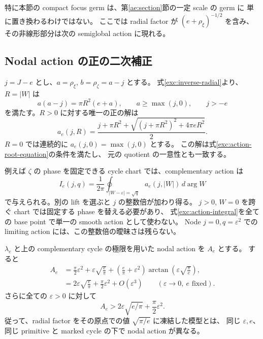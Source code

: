 特に本節の compact focus germ は、第\ref{ae:section}節の一定 scale の germ に
単に置き換わるわけではない。
ここでは radial factor が $(e+\rho_\xi)^{-1/2}$ を含み、
その非線形部分は次の semiglobal action に現れる。

\subsection{Nodal action の正の二次補正}

$j=J-e$ とし、$a=\rho_\xi$, $b=\rho_\zeta=a-j$ とする。
式\eqref{exc:inverse-radial}より、$R=|W|$ は
\begin{equation}\label{exc:action-root-equation}
 a(a-j)=\pi R^2(e+a),\qquad a\ge\max(j,0),\qquad j>-e
\end{equation}
を満たす。$R>0$ に対する唯一の正の解は
\begin{equation}\label{exc:action-root}
 a_e(j,R)=\frac{j+\pi R^2+
     \sqrt{(j+\pi R^2)^2+4\pi eR^2}}2.
\end{equation}
$R=0$ では連続的に $a_e(j,0)=\max(j,0)$ とする。
この解は式\eqref{exc:action-root-equation}の条件を満たし、
元の quotient の一意性とも一致する。

例えば $\zeta$ の phase を固定できる cycle chart では、complementary action は
\begin{equation}\label{exc:action-integral}
 I_e(j,q)=\frac1{2\pi}
       \oint_{|W-\varepsilon|=\sqrt q}a_e(j,|W|)\,d\arg W
\end{equation}
で与えられる。別の lift を選ぶと $j$ の整数倍が加わり得る。
$j>0$, $W=0$ を跨ぐ chart では固定する phase を替える必要があり、
式\eqref{exc:action-integral}を全ての base point で単一の smooth action として使わない。
Node $j=0,q=\varepsilon^2$ での limiting action には、この整数倍の曖昧さは残らない。

\begin{proposition}
\label{exc:nodal-action}
$\lambda_e$ と上の complementary cycle の極限を用いた nodal action を $A_e$ とする。
すると
\begin{align}
 A_e
 &=\frac{\pi}{2}\varepsilon^2
   +\varepsilon\sqrt{\frac e\pi}
   +\left(\frac e\pi+\varepsilon^2\right)
       \arctan\left(\varepsilon\sqrt{\frac\pi e}\right),
       \label{exc:action-closed}\\
 &=2\varepsilon\sqrt{\frac e\pi}
     +\frac\pi2\varepsilon^2+O(\varepsilon^3)
       \qquad(\varepsilon\to0,\ e\text{ fixed}).\label{exc:action-expansion}
\end{align}
さらに全ての $\varepsilon>0$ に対して
\begin{equation}\label{exc:action-positive}
 A_e>2\varepsilon\sqrt{e/\pi}+\frac\pi2\varepsilon^2.
\end{equation}
従って、radial factor をその原点での値 $\sqrt{\pi/e}$ に凍結した模型とは、
同じ $\varepsilon,e$、同じ primitive と marked cycle の下で nodal action が異なる。
\end{proposition}

